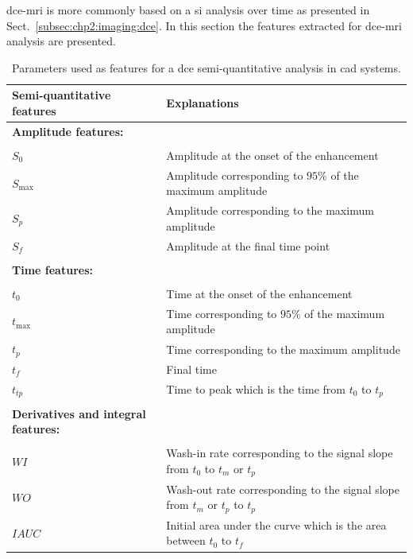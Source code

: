 \ac{dce}-\ac{mri} is more commonly based on a \ac{si} analysis over time as presented in Sect.~\ref{subsec:chp2:imaging:dce}.
In this section the features extracted for \ac{dce}-\ac{mri} analysis are presented.

\begin{table}
  \caption{Parameters used as features for a \acs*{dce} semi-quantitative analysis in \acs*{cad} systems.}
  \scriptsize
  \centering
  \begin{tabularx}{\textwidth}{l X}
    \toprule
    \textbf{Semi-quantitative features} & \textbf{Explanations} \\
    \midrule
    \textbf{Amplitude features:} & \\ \\ [-1.5ex]
    \quad $S_0$ & Amplitude at the onset of the enhancement \\
    \quad $S_{\max}$ & Amplitude corresponding to $95\%$ of the maximum amplitude \\
    \quad $S_{p}$ & Amplitude corresponding to the maximum amplitude \\
    \quad $S_f$ & Amplitude at the final time point \\ \\ [-1.5ex]
    \textbf{Time features:} & \\ \\ [-1.5ex]
    \quad $t_0$ & Time at the onset of the enhancement \\
    \quad $t_{\max}$ & Time corresponding to $95\%$ of the maximum amplitude \\
    \quad $t_{p}$ & Time corresponding to the maximum amplitude \\
    \quad $t_{f}$ & Final time \\
    \quad $t_{tp}$ & Time to peak which is the time from $t_0$ to $t_p$ \\ \\ [-1.5ex]
    \textbf{Derivatives and integral features:} & \\ \\ [-1.5ex]
    \quad $WI$ & Wash-in rate corresponding to the signal slope from $t_0$ to $t_m$ or $t_p$ \\
    \quad $WO$ & Wash-out rate corresponding to the signal slope from $t_m$ or $t_p$ to $t_p$ \\
    \quad $IAUC$ & Initial area under the curve which is the area between $t_0$ to $t_{f}$ \\
    \bottomrule
  \end{tabularx}
\label{tab:semiqua}
\end{table}


